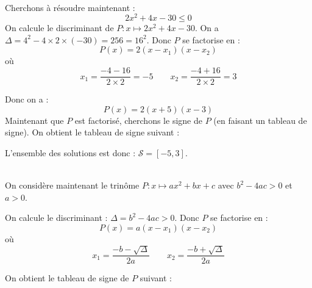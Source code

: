 \documentclass[12pt,fleqn]{report} %
\begin{document}
\begin{example}\text{ }\\
	Cherchons à résoudre maintenant : 
	\[
	2 x^2 + 4 x - 30 \leq 0
	\]
	On calcule le discriminant de $P : x \mapsto 2 x^2 + 4 x - 30$. On a $\Delta = 4^2 - 4\times 2 \times (-30) = 256 = 16^2 $. Donc $P$ se factorise en : 
	\[
	P(x) = 2 \left( x - x_1\right)(x - x_2)
	\]
	où \[
	x_1 = \frac{-4 - 16}{2\times 2} = -5 \qquad x_2 = \frac{-4 + 16}{2 \times 2} = 3
	\]
	
	Donc on a :
	\[
	P(x) = 2( x + 5) (x -3)
	\]
	Maintenant que $P$ est factorisé, cherchons le signe de $P$ (en faisant un tableau de signe).
	On obtient le tableau de signe suivant : 
	
	\begin{center}
	\end{center}
	
	L'ensemble des solutions est donc : $\mathcal{S} = [-5,3]$.
	
\end{example}

\begin{example}\label{Exemple Trinome Ineq Delta positif}\text{ }\\
	
	On considère maintenant le trinôme $P: x \mapsto a x^2 + bx + c$ avec $b^2 - 4ac >0$ et $a>0$.
	
	On calcule le discriminant : $\Delta = b^2 - 4ac >0$. Donc $P$ se factorise en :
	\[
	P(x) = a(x - x_1)(x - x_2)
	\]
	où 
	\[
	x_1 = \frac{-b - \sqrt{\Delta}}{2a} \qquad x_2 = \frac{-b + \sqrt{\Delta}}{2a}
	\]
	
	On obtient le tableau de signe de $P$ suivant : 
	
	\begin{center}
	\end{center}
\end{example}
\end{document}
